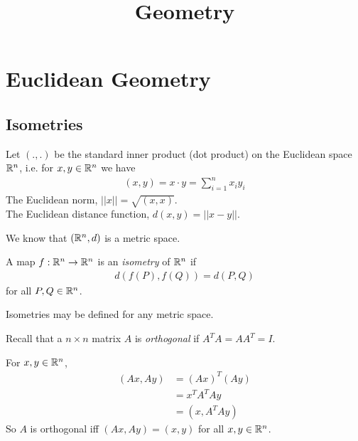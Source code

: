 \documentclass[a4paper]{article}
\begin{document}
\title{Geometry}

\maketitle

\newpage

\tableofcontents

\newpage

\section{Euclidean Geometry}

\subsection{Isometries}

Let $(.,.)$ be the standard inner product (dot product) on the Euclidean space $\mathbb{R}^n$, i.e. for $x,y \in \mathbb{R}^n$ we have
\begin{equation*}
\begin{aligned}
(x,y)=x \cdot y = \sum_{i=1}^n x_i y_i
\end{aligned}
\end{equation*}
The Euclidean norm, $||x|| = \sqrt{(x,x)}$.\\
The Euclidean distance function, $d(x,y) = ||x-y||$.

We know that $(\mathbb{R}^n,d)$ is a metric space.

\begin{defi}
A map $f: \mathbb{R}^n \to \mathbb{R}^n$ is an \emph{isometry} of $\mathbb{R}^n$ if
\begin{equation*}
\begin{aligned}
d(f(P),f(Q)) = d(P,Q)
\end{aligned}
\end{equation*}
for all $P,Q \in \mathbb{R}^n$.

Isometries may be defined for any metric space.
\end{defi}

Recall that a $n \times n$ matrix $A$ is \emph{orthogonal} if $A^T A = AA^T = I$.

For $x,y \in \mathbb{R}^n$,
\begin{equation*}
\begin{aligned}
(Ax,Ay) &= (Ax)^T(Ay)\\
&= x^TA^TAy\\
&=(x,A^TAy)
\end{aligned}
\end{equation*}
So $A$ is orthogonal iff $(Ax,Ay) = (x,y)$ for all $x,y \in \mathbb{R}^n$.
\end{document}
